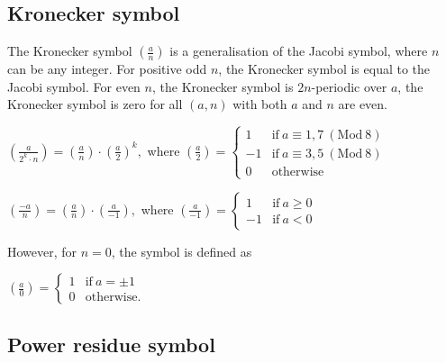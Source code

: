\subsection{Kronecker symbol}
\label{sec:Kronecker symbol}

The Kronecker symbol
$\displaystyle{\left ( \frac{a}{n} \right )}$
is a generalisation of the Jacobi symbol,
where $n$ can be any integer. For positive
odd $n$, the Kronecker symbol is equal to
the Jacobi symbol. For even $n$, the
Kronecker symbol is $2n$-periodic over $a$,
the Kronecker symbol is zero for all
$(a, n)$ with both $a$ and $n$ are even.

\vspace{1em}
\noindent
\( \displaystyle{
    \left ( \frac{a}{2^k \cdot n} \right ) =
    \left ( \frac{a}{n} \right ) \cdot \left ( \frac{a}{2} \right )^k,
}\)
where
\( \displaystyle{
    \left ( \frac{a}{2} \right ) =
    \left \lbrace \begin{array}{rl}
        1  & \text{if}~ a \equiv 1, 7 ~(\text{Mod}~ 8) \\
        -1 & \text{if}~ a \equiv 3, 5 ~(\text{Mod}~ 8) \\
        0  & \text{otherwise}
    \end{array} \right .
}\)

\vspace{1em}
\noindent
\( \displaystyle{
    \left ( \frac{-a}{n} \right ) =
    \left ( \frac{a}{n} \right ) \cdot \left ( \frac{a}{-1} \right ),
}\)
where
\( \displaystyle{
    \left ( \frac{a}{-1} \right ) =
    \left \lbrace \begin{array}{rl}
        1  & \text{if}~ a \ge 0 \\
        -1 & \text{if}~ a < 0
    \end{array} \right .
}\)
\vspace{1em}

\noindent
However, for $n = 0$, the symbol is defined as

\vspace{1em}
\noindent
\( \displaystyle{
    \left ( \frac{a}{0} \right ) =
    \left \lbrace \begin{array}{rl}
        1 & \text{if}~ a = \pm 1 \\
        0 & \text{otherwise.}
    \end{array} \right .
}\)


\subsection{Power residue symbol}
\label{sec:Power residue symbol}

